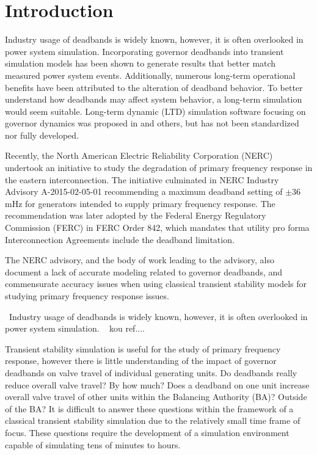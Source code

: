 \section{Introduction}
Industry usage of deadbands is widely known, however, it is often overlooked in power system simulation.
Incorporating governor deadbands into transient simulation models has been shown to generate results that better match measured power system events\cite{kou2016}.
Additionally, numerous long-term operational benefits have been attributed to the alteration of deadband behavior\cite{nercFRI2012}.
To better understand how deadbands may affect system behavior, a long-term simulation would seem suitable.
Long-term dynamic (LTD) simulation software focusing on governor dynamics was proposed in \cite{AGCCresap} and others, but has not been standardized nor fully developed.



Recently, the North American Electric Reliability Corporation (NERC) undertook an initiative to study the degradation of primary frequency response in the eastern interconnection. 
The initiative culminated in NERC Industry Advisory A-2015-02-05-01\cite{NERCxxxx} recommending a maximum deadband setting of $\pm$36 mHz for generators intended to supply primary frequency response. 
The recommendation was later adopted by the Federal Energy Regulatory Commission (FERC) in FERC Order 842, which mandates that utility pro forma Interconnection Agreements include the deadband limitation\cite{FERCxxxx}.

The NERC advisory, and the body of work leading to the advisory, also document a lack of accurate modeling related to governor deadbands, and commensurate accuracy issues when using classical transient stability models for studying primary frequency response issues. 

~Industry usage of deadbands is widely known, however, it is often overlooked in power system simulation.
~ kou ref....

Transient stability simulation is useful for the study of primary frequency response, however there is little understanding of the impact of governor deadbands on valve travel of individual generating units. 
Do deadbands really reduce overall valve travel? By how much? 
Does a deadband on one unit increase overall valve travel of other units within the Balancing Authority (BA)? Outside of the BA? 
It is difficult to answer these questions within the framework of a classical transient stability simulation due to the relatively small time frame of focus. 
These questions require the development of a simulation environment capable of simulating tens of minutes to hours.

